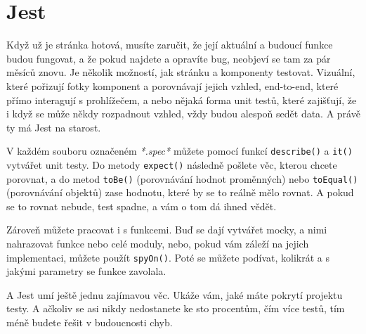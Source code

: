 \section{Jest}

Když už je stránka hotová, musíte zaručit, že její aktuální a budoucí funkce budou fungovat, a že pokud najdete a opravíte bug, neobjeví se tam za pár měsíců znovu. Je několik možností, jak stránku a komponenty testovat\cite{TypesOfTests}. Vizuální, které pořizují fotky komponent a porovnávají jejich vzhled, end-to-end, které přímo interagují s prohlížečem, a nebo nějaká forma unit testů, které zajišťují, že i když se může někdy rozpadnout vzhled, vždy budou alespoň sedět data. A právě ty má Jest na starost.

V každém souboru označeném \textit{*.spec*} můžete pomocí funkcí \texttt{describe()} a \texttt{it()} vytvářet unit testy. Do metody \texttt{expect()} následně pošlete věc, kterou chcete porovnat, a do metod \texttt{toBe()} (porovnávání hodnot proměnných) nebo \texttt{toEqual()} (porovnávání objektů) zase hodnotu, které by se to reálně mělo rovnat. A pokud se to rovnat nebude, test spadne, a vám o tom dá ihned vědět.

Zároveň můžete pracovat i s funkcemi\cite{JestMethods}. Buď se dají vytvářet mocky, a nimi nahrazovat funkce nebo celé moduly, nebo, pokud vám záleží na jejich implementaci, můžete použít \texttt{spyOn()}. Poté se můžete podívat, kolikrát a s jakými parametry se funkce zavolala.

A Jest umí ještě jednu zajímavou věc. Ukáže vám, jaké máte pokrytí projektu testy\cite{JestCoverage}. A ačkoliv se asi nikdy nedostanete ke sto procentům, čím více testů, tím méně budete řešit v budoucnosti chyb.
